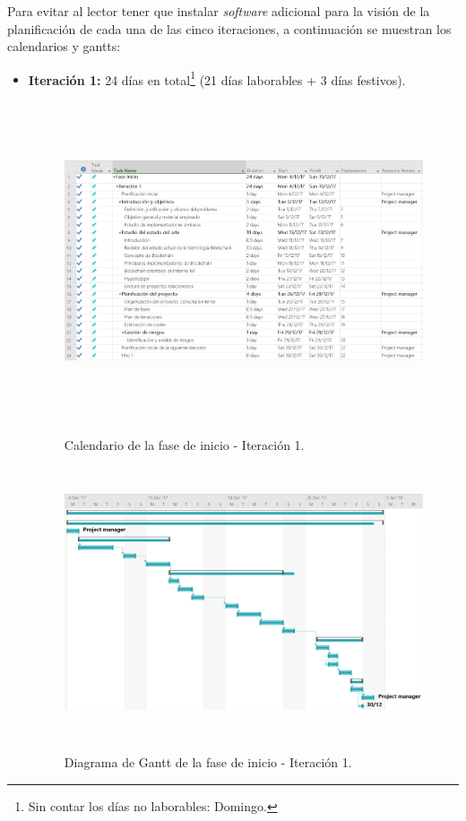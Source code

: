 \documentclass[12pt,a4paper, twoside]{report}
\begin{document}
	Para evitar al lector tener que instalar \textit{software} adicional para la visión de la planificación de cada una de las cinco iteraciones, a continuación se muestran los calendarios y \glspl{gantt}: 
	
	\begin{itemize}

		\item \textbf{Iteración 1:} 24 días en total\footnote{Sin contar los días no laborables: Domingo.} (21 días laborables + 3 días festivos).
		
		\begin{figure}[!ht]   
			\caption{Calendario de la fase de inicio - Iteración 1.} 
			\begin{center} 
		 		\includegraphics[width=16cm,height=9.4cm]{Images/planning/iterations/It1_calendar} \\
				\label{fig:planning-it1-calendar} 
			\end{center}  
		\end{figure}  
		
		\begin{figure}[!ht]   
			\caption{Diagrama de Gantt de la fase de inicio - Iteración 1.} 
			\begin{center} 
		 		\includegraphics[width=16cm,height=8cm]{Images/planning/iterations/It1_gantt} \\
				\label{fig:planning-it1-gantt} 
			\end{center}  
		\end{figure}  
		

\end{itemize}
\end{document}
